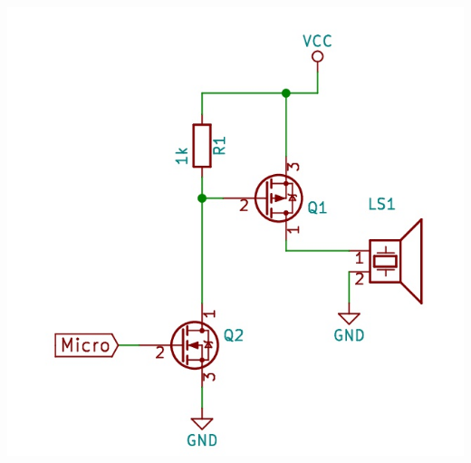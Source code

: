 \begin{minipage}{1\textwidth}
\begin{center}
\includegraphics[width=0.5\textwidth%
]{Abbildungen/h-side.png}
\label{fig:hiside}
\end{center}
\end{minipage}

